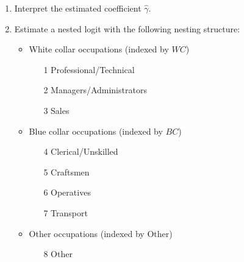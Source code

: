 \documentclass[12pt,english]{article}
\begin{document}
\begin{enumerate}
\item Interpret the estimated coefficient $\hat{\gamma}$.

\item Estimate a nested logit with the following nesting structure:
\begin{itemize}
    \item White collar occupations (indexed by $WC$)
    \begin{itemize}
    \item[1] Professional/Technical 
    \item[2] Managers/Administrators
    \item[3] Sales 
    \end{itemize}
    \item Blue collar occupations (indexed by $BC$)
    \begin{itemize}
    \item[4] Clerical/Unskilled     
    \item[5] Craftsmen              
    \item[6] Operatives             
    \item[7] Transport              
    \end{itemize}
    \item Other occupations (indexed by $\text{Other}$)
    \begin{itemize}
    \item[8] Other 
    \end{itemize}
\end{itemize}


\end{enumerate}
\end{document}
